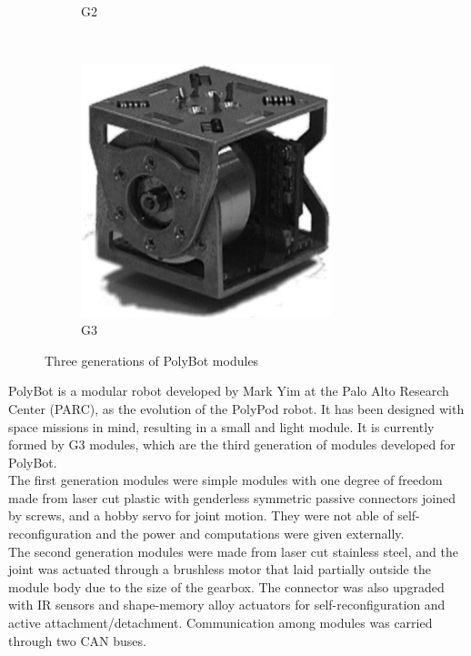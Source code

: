 \begin{figure}
\begin{subfigure}[b]{0.3\textwidth}
                \caption{G2}
                \label{fig:G2}
        \end{subfigure}
        ~
        \begin{subfigure}[b]{0.3\textwidth}
                \centering
                \includegraphics[width=0.8\textwidth]{images/PolyBot_G3.png}
                \caption{G3}
                \label{fig:G3}
        \end{subfigure}
		\caption{Three generations of PolyBot modules}\label{fig:PolyBot}
\end{figure}

PolyBot\cite{yim_modular_2003} is a modular robot developed by Mark Yim at the Palo Alto Research Center (PARC), as the evolution of the PolyPod robot. It has been designed with space missions in mind, resulting in a small and light module. It is currently formed by G3 modules, which are the third generation of modules developed for PolyBot. 
\\

The first generation modules were simple modules with one degree of freedom made from laser cut plastic with genderless symmetric passive connectors joined by screws, and a hobby servo for joint motion. They were not able of self-reconfiguration and the power and computations were given externally.
\\

The second generation modules were made from laser cut stainless steel, and the joint was actuated through a brushless motor that laid partially outside the module body due to the size of the gearbox. The connector was also upgraded with IR sensors and shape-memory alloy actuators for self-reconfiguration and active attachment/detachment. Communication among modules was carried through two CAN buses.
\\

